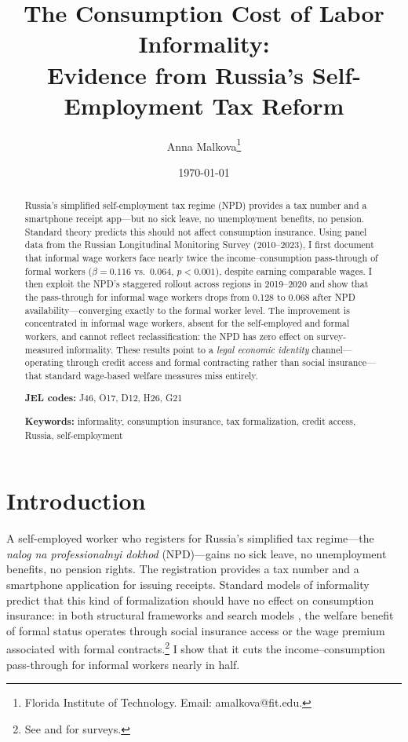 \documentclass[12pt]{article}
\title{The Consumption Cost of Labor Informality:\\ Evidence from Russia's Self-Employment Tax Reform}
\author{Anna Malkova\thanks{Florida Institute of Technology. Email: amalkova@fit.edu.}}
\date{\today}
\begin{document}
\maketitle

\begin{abstract}
Russia's simplified self-employment tax regime (NPD) provides a tax number and a smartphone receipt app---but no sick leave, no unemployment benefits, no pension. Standard theory predicts this should not affect consumption insurance. Using panel data from the Russian Longitudinal Monitoring Survey (2010--2023), I first document that informal wage workers face nearly twice the income--consumption pass-through of formal workers ($\beta = 0.116$ vs.\ $0.064$, $p < 0.001$), despite earning comparable wages. I then exploit the NPD's staggered rollout across regions in 2019--2020 and show that the pass-through for informal wage workers drops from 0.128 to 0.068 after NPD availability---converging exactly to the formal worker level. The improvement is concentrated in informal wage workers, absent for the self-employed and formal workers, and cannot reflect reclassification: the NPD has zero effect on survey-measured informality. These results point to a \textit{legal economic identity} channel---operating through credit access and formal contracting rather than social insurance---that standard wage-based welfare measures miss entirely.

\medskip\noindent
\textbf{JEL codes:} J46, O17, D12, H26, G21

\medskip\noindent
\textbf{Keywords:} informality, consumption insurance, tax formalization, credit access, Russia, self-employment
\end{abstract}

\newpage

\section{Introduction}
\label{sec:intro}

A self-employed worker who registers for Russia's simplified tax regime---the \textit{nalog na professionalnyi dokhod} (NPD)---gains no sick leave, no unemployment benefits, no pension rights. The registration provides a tax number and a smartphone application for issuing receipts. Standard models of informality predict that this kind of formalization should have no effect on consumption insurance: in both structural frameworks \citep{Ulyssea2018} and search models \citep{Meghir2015, BoeriGaribaldi2007}, the welfare benefit of formal status operates through social insurance access or the wage premium associated with formal contracts.\footnote{See \citet{LaPortaShleifer2014} and \citet{Ulyssea2020} for surveys.} I show that it cuts the income--consumption pass-through for informal workers nearly in half.
\end{document}

